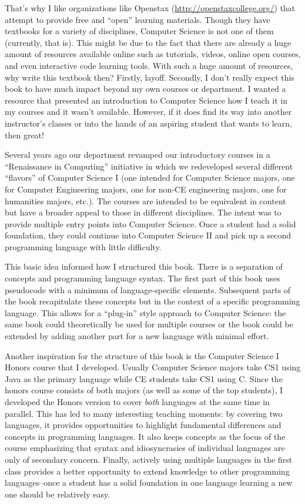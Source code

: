 That's why I like organizations like Openstax (\url{http://openstaxcollege.org/}) that attempt to provide 
free and ``open'' learning materials.  Though they have textbooks for a variety of disciplines, Computer
Science is not one of them (currently, that is).  This might be due to the fact that there are already a 
huge amount of resources available online such as tutorials, videos, online open courses, and even
interactive code learning tools.  With such a huge amount of resources, why write this textbook then?  
Firstly, layoff.  Secondly, I don't really expect this book to have much impact beyond my own courses or
department.  I wanted a resource that presented an introduction to Computer Science how I teach it in my courses and
it wasn't available.  However, if it does find its way into another instructor's classes or into the hands
of an aspiring student that wants to learn, then great!

Several years ago our department revamped our introductory courses in a ``Renaissance in Computing''
initiative in which we redeveloped several different ``flavors'' of Computer Science I (one intended for
Computer Science majors, one for Computer Engineering majors, one for non-CE engineering majors, 
one for humanities majors, etc.).  The courses are intended to be equivalent in content but have a 
broader appeal to those in different disciplines.  The intent was to provide multiple entry points into
Computer Science.  Once a student had a solid foundation, they could continue into Computer Science
II and pick up a second programming language with little difficulty.  

This basic idea informed how I structured this book.  There is a separation of concepts and 
programming language syntax.  The first part of this book uses pseudocode with a 
minimum of language-specific elements.  Subsequent parts of the book recapitulate these concepts
but in the context of a specific programming language.  This allows for a ``plug-in'' style approach
to Computer Science: the same book could theoretically be used for multiple courses or the
book could be extended by adding another part for a new language with minimal effort.

Another inspiration for the structure of this book is the Computer Science I Honors course that
I developed.  Usually Computer Science majors take CS1 using Java as the primary language
while CE students take CS1 using C.  Since the honors course consists of both majors (as well
as some of the top students), I developed the Honors version to cover \emph{both} languages
at the same time in parallel.  This has led to many interesting teaching moments: by covering
two languages, it provides opportunities to highlight fundamental differences and concepts
in programming languages.  It also keeps concepts as the focus of the course emphasizing
that syntax and idiosyncrasies of individual languages are only of secondary concern.  Finally, 
actively using multiple languages in the first class provides a better opportunity to extend 
knowledge to other programming languages--once a student has a solid foundation in one
language learning a new one should be relatively easy.  


